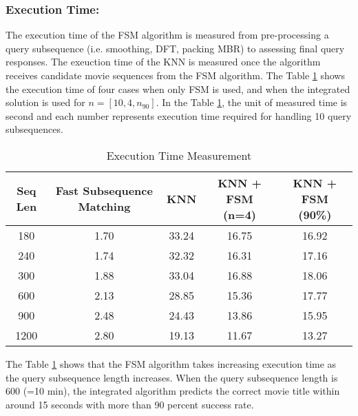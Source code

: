 \subsubsection{Execution Time:} The execution time of the FSM algorithm is measured from pre-processing a query subsequence (i.e. smoothing, DFT, packing MBR) to assessing final query responses. The exeuction time of the KNN is measured once the algorithm receives candidate movie sequences from the FSM algorithm. The Table \ref{tab:exec_table} shows the execution time of four cases when only FSM is used, and when the integrated solution is used for $n = [10, 4, n_{90}]$. In the Table \ref{tab:exec_table}, the unit of measured time is second and each number represents execution time required for handling 10 query subsequences.

\begin{table}[h!]
\begin{center}
\begin{tabular}{|c|| c| c| c| c| }
\hline
Seq Len & Fast Subsequence Matching & KNN & KNN + FSM (n=4) & KNN + FSM (90\%)
\tabularnewline
\hline
180 & 1.70 & 33.24 & 16.75 & 16.92
\tabularnewline
240 & 1.74 & 32.32 & 16.31 & 17.16 
\tabularnewline
300 & 1.88 & 33.04 & 16.88 & 18.06 
\tabularnewline
600 & 2.13 & 28.85 & 15.36 & 17.77
\tabularnewline
900 & 2.48 & 24.43 & 13.86 & 15.95
\tabularnewline
1200 & 2.80 & 19.13 & 11.67 & 13.27
\tabularnewline
\hline
\end{tabular}
\end{center}
\caption{Execution Time Measurement}
\label{tab:exec_table}
\end{table}

The Table \ref{tab:exec_table} shows that the FSM algorithm takes increasing execution time as the query subsequence length increases. When the query subsequence length is 600 (=10 min), the integrated algorithm predicts the correct movie title within around 15 seconds with more than 90 percent success rate. 